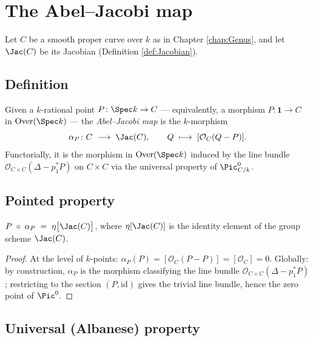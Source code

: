\chapter{The Abel--Jacobi map}
\label{chap:AbelJacobi}

Let $C$ be a smooth proper curve over $k$ as in Chapter \ref{chap:Genus}, and let $\Jac(C)$ be its Jacobian (Definition \ref{def:Jacobian}).

\section{Definition}

\begin{definition}
  \label{def:ofCurve}
  \leanok
  Given a $k$-rational point $P\colon \Spec k \to C$ — equivalently, a morphism $P\colon \mathbf 1 \to C$ in $\textrm{Over}(\Spec k)$ — the \emph{Abel--Jacobi map} is the $k$-morphism
  \[
    \alpha_P\colon C \;\longrightarrow\; \Jac(C),\qquad Q \;\longmapsto\; [\mathcal O_C(Q - P)].
  \]
  Functorially, it is the morphism in $\textrm{Over}(\Spec k)$ induced by the line bundle $\mathcal O_{C \times C}(\Delta - p_1^* P)$ on $C \times C$ via the universal property of $\Pic^0_{C/k}$.
\end{definition}

\section{Pointed property}

\begin{lemma}
  \label{lem:comp_ofCurve}
  \leanok
  $P \;\circ\; \alpha_P \;=\; \eta\bigl[\Jac(C)\bigr]$, where $\eta[\Jac(C)]$ is the identity element of the group scheme $\Jac(C)$.
\end{lemma}

\begin{proof}
  At the level of $k$-points: $\alpha_P(P) = [\mathcal O_C(P - P)] = [\mathcal O_C] = 0$. Globally: by construction, $\alpha_P$ is the morphism classifying the line bundle $\mathcal O_{C \times C}(\Delta - p_1^* P)$; restricting to the section $(P, \mathrm{id})$ gives the trivial line bundle, hence the zero point of $\Pic^0$.
\end{proof}

\section{Universal (Albanese) property}

